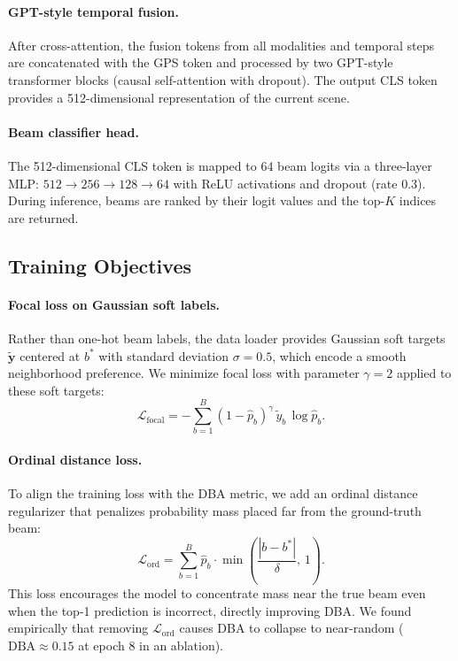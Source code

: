\documentclass[journal,10pt,twoside]{IEEEtran}
\begin{document}
\paragraph{GPT-style temporal fusion.}
After cross-attention, the fusion tokens from all modalities and temporal steps
are concatenated with the GPS token and processed by two GPT-style
transformer blocks \cite{radford2019gpt2} (causal self-attention with dropout).
The output CLS token provides a 512-dimensional representation of the current
scene.

\paragraph{Beam classifier head.}
The 512-dimensional CLS token is mapped to 64 beam logits via a three-layer MLP:
$512 \to 256 \to 128 \to 64$ with ReLU activations and dropout (rate 0.3).
During inference, beams are ranked by their logit values and the top-$K$ indices
are returned.

\subsection{Training Objectives}

\paragraph{Focal loss on Gaussian soft labels.}
Rather than one-hot beam labels, the data loader provides Gaussian soft targets
$\tilde{\mathbf{y}}$ centered at $b^*$ with standard deviation $\sigma=0.5$,
which encode a smooth neighborhood preference. We minimize focal loss
\cite{lin2017focal} with parameter $\gamma=2$ applied to these soft targets:
\begin{equation}
  \mathcal{L}_{\text{focal}}
    = -\sum_{b=1}^{B} (1 - \hat{p}_b)^{\gamma}\,\tilde{y}_b\,\log \hat{p}_b.
  \label{eq:focal}
\end{equation}

\paragraph{Ordinal distance loss.}
To align the training loss with the DBA metric, we add an ordinal distance
regularizer that penalizes probability mass placed far from the ground-truth beam:
\begin{equation}
  \mathcal{L}_{\text{ord}}
    = \sum_{b=1}^{B} \hat{p}_b \cdot
      \min\!\left(\frac{|b - b^*|}{\delta},\, 1\right).
  \label{eq:ordinal}
\end{equation}
This loss encourages the model to concentrate mass near the true beam even when
the top-1 prediction is incorrect, directly improving DBA.
We found empirically that removing $\mathcal{L}_{\text{ord}}$ causes DBA to
collapse to near-random ($\text{DBA} \approx 0.15$ at epoch 8 in an ablation).
\end{document}
